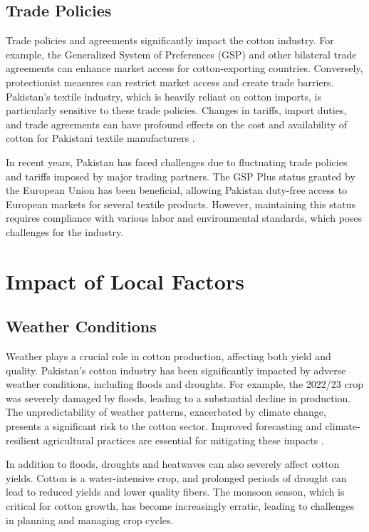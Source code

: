 \documentclass[12pt]{article}
\begin{document}
\subsection{Trade Policies}

Trade policies and agreements significantly impact the cotton industry. For example, the Generalized System of Preferences (GSP) and other bilateral trade agreements can enhance market access for cotton-exporting countries. Conversely, protectionist measures can restrict market access and create trade barriers. Pakistan's textile industry, which is heavily reliant on cotton imports, is particularly sensitive to these trade policies. Changes in tariffs, import duties, and trade agreements can have profound effects on the cost and availability of cotton for Pakistani textile manufacturers \cite{usda2023, usda2022}.

In recent years, Pakistan has faced challenges due to fluctuating trade policies and tariffs imposed by major trading partners. The GSP Plus status granted by the European Union has been beneficial, allowing Pakistan duty-free access to European markets for several textile products. However, maintaining this status requires compliance with various labor and environmental standards, which poses challenges for the industry.

\section{Impact of Local Factors}

\subsection{Weather Conditions}

Weather plays a crucial role in cotton production, affecting both yield and quality. Pakistan's cotton industry has been significantly impacted by adverse weather conditions, including floods and droughts. For example, the 2022/23 crop was severely damaged by floods, leading to a substantial decline in production. The unpredictability of weather patterns, exacerbated by climate change, presents a significant risk to the cotton sector. Improved forecasting and climate-resilient agricultural practices are essential for mitigating these impacts \cite{usda2023, usda2021}.

In addition to floods, droughts and heatwaves can also severely affect cotton yields. Cotton is a water-intensive crop, and prolonged periods of drought can lead to reduced yields and lower quality fibers. The monsoon season, which is critical for cotton growth, has become increasingly erratic, leading to challenges in planning and managing crop cycles.
\end{document}

